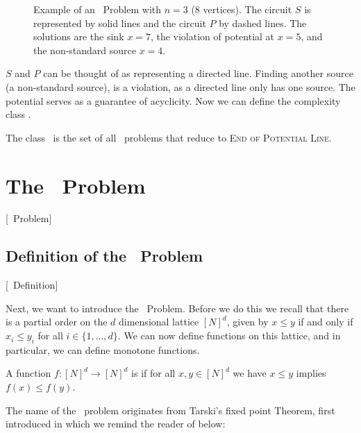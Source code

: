 \begin{figure}[ht]
    \centering
    \caption[Example of an \EOPL\ Problem]{Example of an \EOPL\ Problem with $n=3$ (8 vertices).
        The circuit $S$ is represented by solid lines and the circuit $P$ by dashed lines.
        The solutions are the sink $x=7$, the violation of potential at $x=5$, and the non-standard source $x=4$.}
    \label{fig:eopl_example}
\end{figure}

$S$ and $P$ can be thought of as representing a directed line. Finding another source (a non-standard source), is a violation, as a directed line only has one source. The potential serves as a guarantee of acyclicity. Now we can define the complexity class \EOPL.

\begin{definition}[\EOPL]
    The class \EOPL\ is the set of all \TFNP\ problems that reduce to \textsc{End of Potential Line}.
\end{definition}

\section{The \Tarski\ Problem}[\Tarski\ Problem]
\label{sec:tarski_problem}

\subsection{Definition of the \Tarski\ Problem}[\Tarski\ Definition]

Next, we want to introduce the \Tarski\ Problem. Before we do this we recall that there is a partial order on the $d$ dimensional lattice ${[N]}^d$, given by $x \leq y$ if and only if $x_i \leq y_i$ for all $i \in \{1, \dots, d\}$. We can now define functions on this lattice, and in particular, we can define monotone functions.

\begin{definition}
    A function $f : {[N]}^d \rightarrow {[N]}^d$ is  if for all $x, y \in {[N]}^d$ we have $x \leq y$ implies $f(x) \leq f(y)$.
\end{definition}

The name of the \Tarski\ problem originates from Tarski's fixed point Theorem, first introduced in  which we remind the reader of below:

